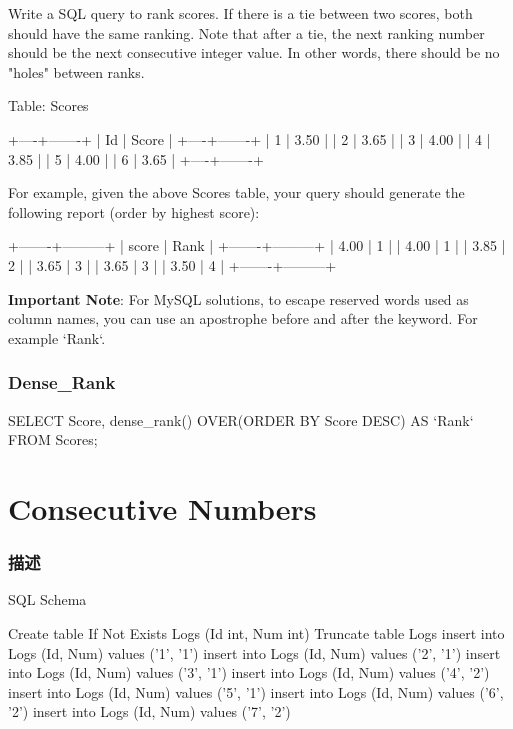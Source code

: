 Write a SQL query to rank scores. If there is a tie between two scores, both should have the same ranking. Note that after a tie, the next ranking number should be the next consecutive integer value. In other words, there should be no "holes" between ranks.

Table: Scores
\begin{Code}
+----+-------+
| Id | Score |
+----+-------+
| 1  | 3.50  |
| 2  | 3.65  |
| 3  | 4.00  |
| 4  | 3.85  |
| 5  | 4.00  |
| 6  | 3.65  |
+----+-------+
\end{Code}

For example, given the above Scores table, your query should generate the following report (order by highest score):
\begin{Code}
+-------+---------+
| score | Rank    |
+-------+---------+
| 4.00  | 1       |
| 4.00  | 1       |
| 3.85  | 2       |
| 3.65  | 3       |
| 3.65  | 3       |
| 3.50  | 4       |
+-------+---------+
\end{Code}

\textbf{Important Note}: For MySQL solutions, to escape reserved words used as column names, you can use an apostrophe before and after the keyword. For example `Rank`.

\subsubsection{Dense_Rank}
\begin{Code}
SELECT Score, dense_rank() OVER(ORDER BY Score DESC) AS `Rank` FROM Scores;
\end{Code}

\section{Consecutive Numbers} %
\label{sec:consecutive-numbers}


\subsubsection{描述}
SQL Schema

\begin{Code}
Create table If Not Exists Logs (Id int, Num int)
Truncate table Logs
insert into Logs (Id, Num) values ('1', '1')
insert into Logs (Id, Num) values ('2', '1')
insert into Logs (Id, Num) values ('3', '1')
insert into Logs (Id, Num) values ('4', '2')
insert into Logs (Id, Num) values ('5', '1')
insert into Logs (Id, Num) values ('6', '2')
insert into Logs (Id, Num) values ('7', '2')
\end{Code}


